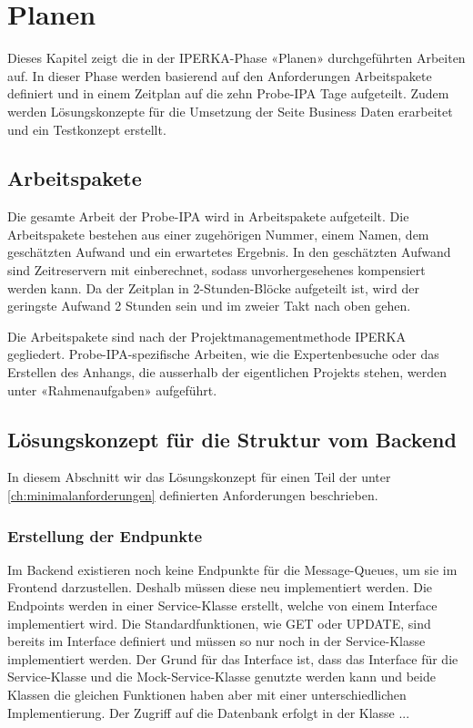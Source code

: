 \chapter{Planen}\label{ch:planen}
Dieses Kapitel zeigt die in der IPERKA-Phase «Planen» durchgeführten Arbeiten auf. In dieser Phase werden basierend auf den Anforderungen Arbeitspakete definiert und in einem Zeitplan auf die zehn Probe-IPA Tage aufgeteilt. Zudem werden Lösungskonzepte für die Umsetzung der Seite Business Daten erarbeitet und ein Testkonzept erstellt.

\section{Arbeitspakete}
Die gesamte Arbeit der Probe-IPA wird in Arbeitspakete aufgeteilt. Die Arbeitspakete bestehen aus einer zugehörigen Nummer, einem Namen, dem geschätzten Aufwand und ein erwartetes Ergebnis. In den geschätzten Aufwand sind Zeitreservern mit einberechnet, sodass unvorhergesehenes kompensiert werden kann. Da der Zeitplan in 2-Stunden-Blöcke aufgeteilt ist, wird der geringste Aufwand 2 Stunden sein und im zweier Takt nach oben gehen.

Die Arbeitspakete sind nach der Projektmanagementmethode IPERKA gegliedert. Probe-IPA-spezifische Arbeiten, wie die Expertenbesuche oder das Erstellen des Anhangs, die ausserhalb der eigentlichen Projekts stehen, werden unter «Rahmenaufgaben» aufgeführt.


\section{Lösungskonzept für die Struktur vom Backend}
In diesem Abschnitt wir das Lösungskonzept für einen Teil der unter \ref{ch:minimalanforderungen} definierten Anforderungen beschrieben.

\subsection{Erstellung der Endpunkte}
Im Backend existieren noch keine Endpunkte für die Message-Queues, um sie im Frontend darzustellen. Deshalb müssen diese neu implementiert werden. Die Endpoints werden in einer Service-Klasse erstellt, welche von einem Interface implementiert wird. Die Standardfunktionen, wie GET oder UPDATE, sind bereits im Interface definiert und müssen so nur noch in der Service-Klasse implementiert werden. Der Grund für das Interface ist, dass das Interface für die Service-Klasse und die Mock-Service-Klasse genutzte werden kann und beide Klassen die gleichen Funktionen haben aber mit einer unterschiedlichen Implementierung.
Der Zugriff auf die Datenbank erfolgt in der Klasse ...

\newpage